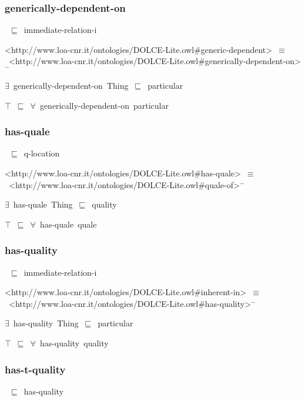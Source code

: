 \documentclass{article}
\begin{document}
\subsubsection*{generically-dependent-on}

~\ensuremath{\sqsubseteq}~immediate-relation-i

<http://www.loa-cnr.it/ontologies/DOLCE-Lite.owl#generic-dependent>~\ensuremath{\equiv}~<http://www.loa-cnr.it/ontologies/DOLCE-Lite.owl#generically-dependent-on>\ensuremath{^-}

\ensuremath{\exists}~generically-dependent-on~Thing~\ensuremath{\sqsubseteq}~particular

\ensuremath{\top}~\ensuremath{\sqsubseteq}~\ensuremath{\forall}~generically-dependent-on~particular

\subsubsection*{has-quale}

~\ensuremath{\sqsubseteq}~q-location

<http://www.loa-cnr.it/ontologies/DOLCE-Lite.owl#has-quale>~\ensuremath{\equiv}~<http://www.loa-cnr.it/ontologies/DOLCE-Lite.owl#quale-of>\ensuremath{^-}

\ensuremath{\exists}~has-quale~Thing~\ensuremath{\sqsubseteq}~quality

\ensuremath{\top}~\ensuremath{\sqsubseteq}~\ensuremath{\forall}~has-quale~quale

\subsubsection*{has-quality}

~\ensuremath{\sqsubseteq}~immediate-relation-i

<http://www.loa-cnr.it/ontologies/DOLCE-Lite.owl#inherent-in>~\ensuremath{\equiv}~<http://www.loa-cnr.it/ontologies/DOLCE-Lite.owl#has-quality>\ensuremath{^-}

\ensuremath{\exists}~has-quality~Thing~\ensuremath{\sqsubseteq}~particular

\ensuremath{\top}~\ensuremath{\sqsubseteq}~\ensuremath{\forall}~has-quality~quality

\subsubsection*{has-t-quality}

~\ensuremath{\sqsubseteq}~has-quality
\end{document}
